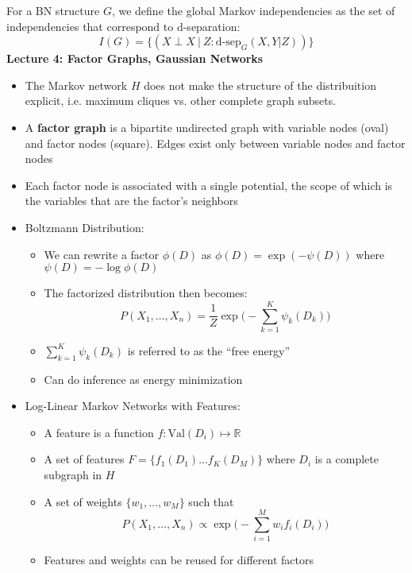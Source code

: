 \documentclass{article}
\begin{document}
For a BN structure $G$, we define the global Markov independencies as the set of independencies that correspond to d-separation: \begin{equation*}
    I(G) = \{(X \perp X\ |\ Z : \text{d-sep}_G(X, Y | Z))\}
\end{equation*}
\textbf{Lecture 4: Factor Graphs, Gaussian Networks}
\begin{itemize}
    \item The Markov network $H$ does not make the structure of the distribuition explicit, i.e. maximum cliques vs. other complete graph subsets. 
    \item A \textbf{factor graph} is a bipartite undirected graph with variable nodes (oval) and factor nodes (square). Edges exist only between variable nodes and factor nodes 
    \item Each factor node is associated with a single potential, the scope of which is the variables that are the factor's neighbors 
    \item Boltzmann Distribution: \begin{itemize}
        \item We can rewrite a factor $\phi(D)$ as $\phi(D) = \exp (-\psi(D))$ where $\psi(D) = - \log \phi(D)$
        \item The factorized distribution then becomes: \begin{equation*}
            P(X_1, \dots , X_n) = \frac{1}{Z}\exp \bigg( -\sum_{k = 1}^{K} \psi_k (D_k)\bigg)
        \end{equation*}
        \item $\sum_{k = 1}^{K}\psi_k(D_k)$ is referred to as the ``free energy''
        \item Can do inference as energy minimization
    \end{itemize}
    \item Log-Linear Markov Networks with Features: \begin{itemize}
        \item A feature is a function $f: \text{Val}(D_i) \mapsto \mathbb{R}$
        \item A set of features $F = \{f_1(D_1) \dots f_K(D_M)\}$ where $D_i$ is a complete subgraph in $H$
        \item A set of weights $\{w_1, \dots , w_M\}$ such that \begin{equation*}
            P(X_1, \dots , X_n) \propto \exp \bigg(- \sum_{i = 1}^{M}w_if_i(D_i) \bigg)
        \end{equation*}
        \item Features and weights can be reused for different factors 

\end{itemize}
\end{itemize}
\end{document}
